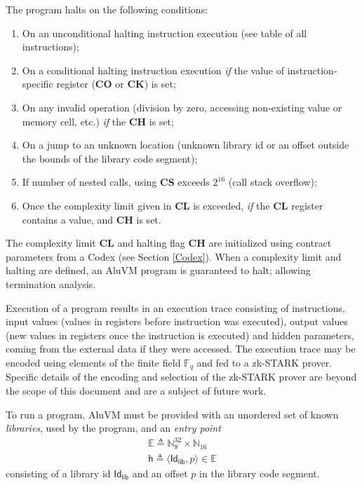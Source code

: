 \documentclass[9pt,oneside]{amsart}
\begin{document}
\begin{multicols}{2}
The program halts on the following conditions:

\begin{enumerate}
\item On an unconditional halting instruction execution (see table of all instructions);
\item On a conditional halting instruction execution
   \emph{if} the value of instruction-specific register (\textbf{CO} or \textbf{CK}) is set;
\item On any invalid operation (division by zero, accessing non-existing value or memory cell, etc.)
   \emph{if} the \textbf{CH} is set;
\item On a jump to an unknown location
   (unknown library id or an offset outside the bounds of the library code segment);
\item If number of nested calls, using \textbf{CS} exceeds $2^16$
   (call stack overflow);
\item Once the complexity limit given in \textbf{CL} is exceeded,
   \emph{if} the \textbf{CL} register contains a value, and \textbf{CH} is set.
\end{enumerate}

The complexity limit \textbf{CL} and halting flag \textbf{CH} are initialized using contract parameters
from a Codex (see Section \ref{Codex}). When a complexity limit and halting are defined, an AluVM program
is guaranteed to halt; allowing termination analysis.

Execution of a program results in an execution trace consisting of instructions,
input values (values in registers before instruction was executed),
output values (new values in registers once the instruction is executed)
and hidden parameters, coming from the external data if they were accessed.
The execution trace may be encoded using elements of the finite field $\mathbb{F}_q$
and fed to a zk-STARK prover. Specific details of the encoding and selection of the zk-STARK prover
are beyond the scope of this document and are a subject of future work.

To run a program, AluVM must be provided with an unordered set of known \emph{libraries},
used by the program, and an \emph{entry point}
\noindent
\begin{gather}\label{eq:e}
\mathbb{E} \triangleq \mathbb{N}^{32}_8 \times \mathbb{N}_{16} \\
\mathsf{h} \triangleq \langle \mathsf{Id_{lib}}, p \rangle \in \mathbb{E}
\end{gather}
\noindent
consisting of a library id $\mathsf{Id_{lib}}$ and an offset $p$ in the library code segment.


\end{multicols}
\end{document}
